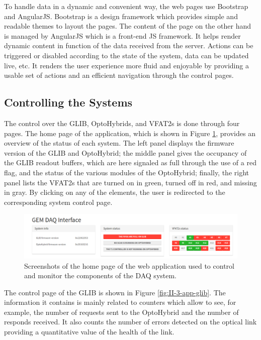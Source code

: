       To handle data in a dynamic and convenient way, the web pages use Bootstrap and AngularJS. Bootstrap is a design framework which provides simple and readable themes to layout the pages. The content of the page on the other hand is managed by AngularJS which is a front-end JS framework. It helps render dynamic content in function of the data received from the server. Actions can be triggered or disabled according to the state of the system, data can be updated live, etc. It renders the user experience more fluid and enjoyable by providing a usable set of actions and an efficient navigation through the control pages.

    \subsection{Controlling the Systems}

      The control over the GLIB, OptoHybrids, and VFAT2s is done through four pages. The home page of the application, which is shown in Figure \ref{fig:II-3-app-home}, provides an overview of the status of each system. The left panel displays the firmware version of the GLIB and OptoHybrid; the middle panel gives the occupancy of the GLIB readout buffers, which are here signaled as full through the use of a red flag, and the status of the various modules of the OptoHybrid; finally, the right panel lists the VFAT2s that are turned on in green, turned off in red, and missing in gray. By clicking on any of the elements, the user is redirected to the corresponding system control page. \\

      \begin{figure}[h!]
        \centering
        \includegraphics[width=\textwidth]{img/II-3-test-beam/app-home.png}
        \caption{Screenshots of the home page of the web application used to control and monitor the components of the DAQ system.}
        \label{fig:II-3-app-home}
      \end{figure}

      The control page of the GLIB is shown in Figure \ref{fig:II-3-app-glib}. The information it contains is mainly related to counters which allow to see, for example, the number of requests sent to the OptoHybrid and the number of responds received. It also counts the number of errors detected on the optical link providing a quantitative value of the health of the link. \\

